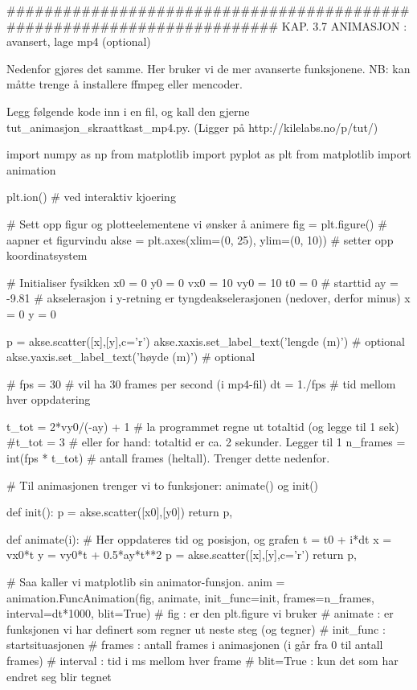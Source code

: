 ######################################################################## 
KAP. 3.7  ANIMASJON : avansert, lage mp4 (optional)

Nedenfor gjøres det samme.
Her bruker vi de mer avanserte funksjonene. 
NB: kan måtte trenge å installere ffmpeg eller mencoder. 

Legg følgende kode inn i en fil, og kall den gjerne tut_animasjon_skraattkast_mp4.py. 
(Ligger på http://kilelabs.no/p/tut/)


import numpy as np
from matplotlib import pyplot as plt
from matplotlib import animation

plt.ion()   # ved interaktiv kjoering 

# Sett opp figur og plotteelementene vi ønsker å animere
fig = plt.figure()                           # aapner et figurvindu
akse = plt.axes(xlim=(0, 25), ylim=(0, 10))  # setter opp koordinatsystem

# Initialiser fysikken
x0  = 0
y0  = 0
vx0 = 10
vy0 = 10
t0  = 0      # starttid
ay  = -9.81  # akselerasjon i y-retning er tyngdeakselerasjonen (nedover, derfor minus)
x   = 0
y   = 0

p = akse.scatter([x],[y],c='r')
akse.xaxis.set_label_text('lengde (m)')  # optional
akse.yaxis.set_label_text('høyde (m)')   # optional

# 
fps = 30      # vil ha 30 frames per second (i mp4-fil)
dt = 1./fps   # tid mellom hver oppdatering 

t_tot = 2*vy0/(-ay) + 1      # la programmet regne ut totaltid (og legge til 1 sek)
#t_tot = 3                   # eller for hand: totaltid er ca. 2 sekunder. Legger til 1
n_frames = int(fps * t_tot)  # antall frames (heltall). Trenger dette nedenfor. 



# Til animasjonen trenger vi to funksjoner: animate() og init() 

def init():
    p = akse.scatter([x0],[y0])
    return p,


def animate(i):
    # Her oppdateres tid og posisjon, og grafen
    t = t0 + i*dt
    x = vx0*t
    y = vy0*t + 0.5*ay*t**2
    p = akse.scatter([x],[y],c='r')
    return p,
    

# Saa kaller vi matplotlib sin animator-funsjon.  
anim = animation.FuncAnimation(fig, animate, init_func=init, frames=n_frames, interval=dt*1000, blit=True)
# fig       : er den plt.figure vi bruker
# animate   : er funksjonen vi har definert som regner ut neste steg (og tegner)
# init_func : startsituasjonen
# frames    : antall frames i animasjonen (i går fra 0 til antall frames)
# interval  : tid i ms mellom hver frame 
# blit=True : kun det som har endret seg blir tegnet 



